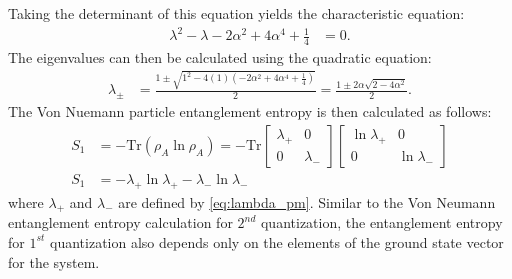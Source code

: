 \noindent Taking the determinant of this equation yields the characteristic equation:
\begin{align}
\lambda^2 - \lambda - 2 \alpha^2 + 4 \alpha^4 + \frac{1}{4} &= 0.
\end{align}
\noindent The eigenvalues can then be calculated using the quadratic equation:
\begin{align}
\lambda_{\pm} &= \frac{1 \pm \sqrt{1^2 - 4 \left( 1 \right) \left( -2 \alpha^2 + 4 \alpha^4 + \frac{1}{4} \right) }}{2} = \frac{1 \pm 2 \alpha \sqrt{2 - 4 \alpha^2}}{2}.
\label{eq:lambda_pm}
\end{align}
\noindent The Von Nuemann particle entanglement entropy is then calculated as follows:
\begin{align}
S_1 &= -\text{Tr} \left( \rho_A \ln{\rho_A} \right) = -\text{Tr} \begin{bmatrix} \lambda_+ & 0 \\ 0 & \lambda_- \end{bmatrix} \begin{bmatrix} \ln{\lambda_+} & 0 \\ 0 & \ln{\lambda_-} \end{bmatrix} \\
S_1 &= -\lambda_+ \ln{\lambda_+} - \lambda_- \ln{\lambda_-}
\end{align}
\noindent where $\lambda_+$ and $\lambda_-$ are defined by \cref*{eq:lambda_pm}. Similar to the Von Neumann entanglement entropy calculation for $2^{nd}$ quantization, the entanglement entropy for $1^{st}$ quantization also depends only on the elements of the ground state vector for the system.
